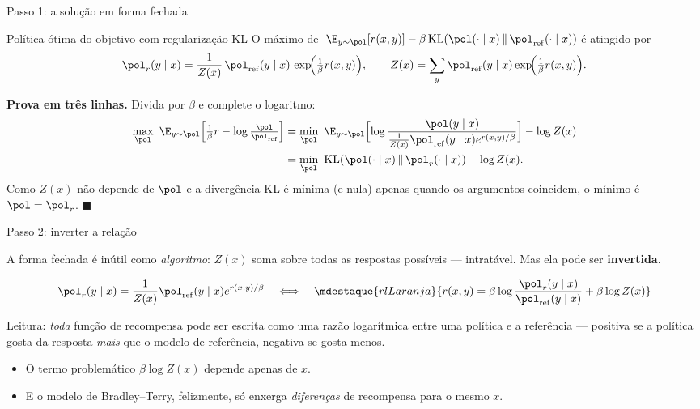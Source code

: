 \documentclass[aspectratio=169, 11pt]{beamer}
\newcommand{\pref}{\pol_{\mathrm{ref}}}          %
\newcommand{\KLd}[2]{\mathrm{KL}\!\left(#1 \,\middle\|\, #2\right)}
\begin{document}
\begin{frame}{Passo 1: a solução em forma fechada}

  \begin{teobox}{Política ótima do objetivo com regularização KL}
    O máximo de
    $\;\E_{y\sim\pol}[r(x,y)] - \beta\,\KLd{\pol(\cdot\mid x)}{\pref(\cdot\mid x)}$
    é atingido por
    \[
      \pol_{r}(y\mid x) = \frac{1}{Z(x)}\,\pref(y\mid x)\,
        \exp\!\Bigl(\tfrac{1}{\beta} r(x,y)\Bigr),
      \qquad
      Z(x) = \sum_{y}\pref(y\mid x)\exp\!\Bigl(\tfrac{1}{\beta} r(x,y)\Bigr).
    \]
  \end{teobox}

  \pause
  \textbf{Prova em três linhas.} Divida por $\beta$ e complete o logaritmo:
  \begin{align*}
    \max_{\pol}\ \E_{y\sim\pol}\Bigl[\tfrac{1}{\beta}r - \log\tfrac{\pol}{\pref}\Bigr]
    &= \min_{\pol}\ \E_{y\sim\pol}\Bigl[\log\frac{\pol(y\mid x)}
        {\tfrac{1}{Z(x)}\pref(y\mid x)e^{r(x,y)/\beta}}\Bigr] - \log Z(x)\\
    &= \min_{\pol}\ \KLd{\pol(\cdot\mid x)}{\pol_r(\cdot\mid x)} - \log Z(x).
  \end{align*}
  Como $Z(x)$ não depende de $\pol$ e a divergência KL é mínima (e nula) apenas
  quando os argumentos coincidem, o mínimo é $\pol = \pol_r$. \hfill$\blacksquare$
\end{frame}

\begin{frame}{Passo 2: inverter a relação}

  A forma fechada é inútil como \emph{algoritmo}: $Z(x)$ soma sobre todas as
  respostas possíveis --- intratável. Mas ela pode ser \textbf{invertida}.

  \[
    \pol_{r}(y\mid x) = \frac{1}{Z(x)}\pref(y\mid x) e^{r(x,y)/\beta}
    \quad\Longleftrightarrow\quad
    \mdestaque{rlLaranja}{r(x,y) = \beta \log \frac{\pol_{r}(y\mid x)}{\pref(y\mid x)}
      + \beta\log Z(x)}
  \]

  \begin{ideiabox}
    Leitura: \emph{toda} função de recompensa pode ser escrita como uma razão
    logarítmica entre uma política e a referência --- positiva se a política
    gosta da resposta \emph{mais} que o modelo de referência, negativa se gosta
    menos.
  \end{ideiabox}

  \begin{itemize}\setlength{\itemsep}{0.25ex}
    \item O termo problemático $\beta\log Z(x)$ depende apenas de $x$.
    \item E o modelo de Bradley--Terry, felizmente, só enxerga \emph{diferenças}
      de recompensa para o mesmo $x$.
  \end{itemize}
\end{frame}
\end{document}
